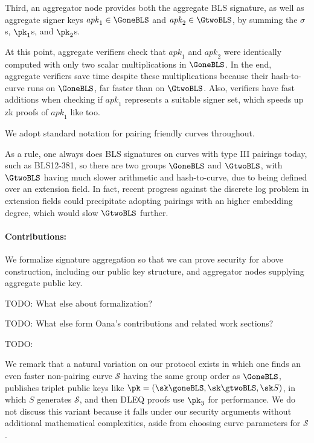 \def\apk{\mathit{apk}}

Third, an aggregator node provides both the aggregate BLS signature,
as well as aggregate signer keys $\apk_1 \in \GoneBLS$ and
$\apk_2 \in \GtwoBLS$, by summing the $\sigma$s, $\pk_1$s, and $\pk_2$s.

At this point, aggregate verifiers check that $\apk_1$ and $\apk_2$ were
identically computed with only two scalar multiplications in $\GoneBLS$.
In the end, aggregate verifiers save time despite these multiplications
because their hash-to-curve runs on $\GoneBLS$, far faster than on $\GtwoBLS$.
Also, verifiers have fast additions when checking if $\apk_1$ represents
a suitable signer set, which speeds up zk proofs of $\apk_1$ like \cite{ourLC} too.


We adopt standard notation for pairing friendly curves throughout.

As a rule, one always does BLS signatures on curves with type III pairings
today, such as BLS12-381, so there are two groups $\GoneBLS$ and $\GtwoBLS$,
with $\GtwoBLS$ having much slower arithmetic and hash-to-curve, due to
being defined over an extension field.  In fact, recent progress
\cite{???} against the discrete log problem in extension fields
could precipitate adopting pairings with an higher embedding degree,
which would slow $\GtwoBLS$ further.

\paragraph{Contributions:}

We formalize signature aggregation so that we can prove security for above
construction, including our public key structure, and aggregator nodes
supplying aggregate public key. 

TODO:  What else about formalization?


TODO:  What else form Oana's contributions and related work sections?


TODO:  \cite{ourLC}  \cite{aggregate_BLS_signatures}  \cite{boneh_compact_multisig}


We remark that a natural variation on our protocol exists in which
one finds an even faster non-pairing curve $\mathcal{S}$ having the same
group order as $\GoneBLS$,  publishes triplet public keys like
$\pk = (\sk \goneBLS, \sk \gtwoBLS, \sk S)$, in which $S$ generates
$\mathcal{S}$, and then DLEQ proofs use $\pk_3$ for performance.
We do not discuss this variant because it falls under our security
arguments without additional mathematical complexities,
 aside from choosing curve parameters for $\mathcal{S}$.




